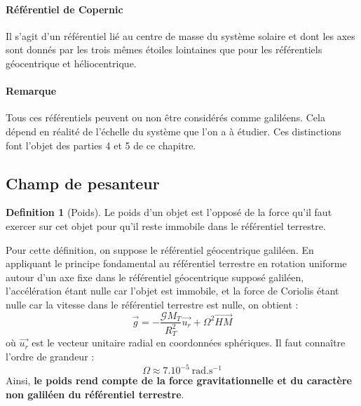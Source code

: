 \documentclass[french]{book}
\theoremstyle{plain}
\theoremstyle{definition}
\newtheorem{dfn}{Definition}
\theoremstyle{remark}
\newcommand{\inv}{^{-1}}
\begin{document}
\paragraph{Référentiel de Copernic} Il s'agit d'un référentiel lié au centre de masse du système solaire et dont les axes sont donnés par les trois mêmes étoiles lointaines que pour les référentiels géocentrique et héliocentrique.
\paragraph{Remarque} Tous ces référentiels peuvent ou non être considérés comme galiléens. Cela dépend en réalité de l'échelle du système que l'on a à étudier. Ces distinctions font l'objet des parties 4 et 5 de ce chapitre.
\subsection{Champ de pesanteur}
\begin{dfn}[Poids]
	Le poids d'un objet est l'opposé de la force qu'il faut exercer sur cet objet pour qu'il reste immobile dans le référentiel terrestre.
\end{dfn}
Pour cette définition, on suppose le référentiel géocentrique galiléen. En appliquant le principe fondamental au référentiel terrestre en rotation uniforme autour d'un axe fixe dans le référentiel géocentrique supposé galiléen, l'accélération étant nulle car l'objet est immobile, et la force de Coriolis étant nulle car la vitesse dans le référentiel terrestre est nulle, on obtient : $$\overrightarrow{g}=-\frac{\mathcal{G}M_T}{R_T^2}\overrightarrow{u_r}+\Omega^2\overrightarrow{HM}$$ où $\overrightarrow{u_r}$ est le vecteur unitaire radial en coordonnées sphériques. Il faut connaître l'ordre de grandeur : $$\Omega\approx 7.10^{-5}\ \text{rad}.\text{s}\inv$$ Ainsi, \textbf{le poids rend compte de la force gravitationnelle et du caractère non galiléen du référentiel terrestre}.
\end{document}
